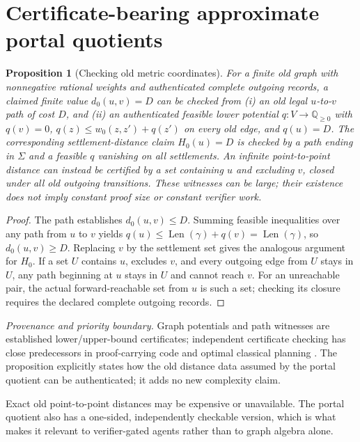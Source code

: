 \documentclass[11pt,letterpaper]{article}
\newtheorem{proposition}[theorem]{Proposition}
\newcommand{\attrib}[1]{\par\noindent\textit{Provenance and priority boundary.} #1\par}
\begin{document}
\section{Certificate-bearing approximate portal quotients}
\begin{proposition}[Checking old metric coordinates]\label{prop:metricverify}
For a finite old graph with nonnegative rational weights and authenticated complete outgoing records, a claimed finite value $d_0(u,v)=D$ can be checked from (i) an old legal $u$-to-$v$ path of cost $D$, and (ii) an authenticated feasible lower potential $q:V\to\mathbb Q_{\ge0}$ with $q(v)=0$, $q(z)\le w_0(z,z')+q(z')$ on every old edge, and $q(u)=D$. The corresponding settlement-distance claim $H_0(u)=D$ is checked by a path ending in $\Sigma$ and a feasible $q$ vanishing on all settlements. An infinite point-to-point distance can instead be certified by a set containing $u$ and excluding $v$, closed under all old outgoing transitions. These witnesses can be large; their existence does not imply constant proof size or constant verifier work.
\end{proposition}
\begin{proof}
The path establishes $d_0(u,v)\le D$. Summing feasible inequalities over any path from $u$ to $v$ yields $q(u)\le\operatorname{Len}(\gamma)+q(v)=\operatorname{Len}(\gamma)$, so $d_0(u,v)\ge D$. Replacing $v$ by the settlement set gives the analogous argument for $H_0$. If a set $U$ contains $u$, excludes $v$, and every outgoing edge from $U$ stays in $U$, any path beginning at $u$ stays in $U$ and cannot reach $v$. For an unreachable pair, the actual forward-reachable set from $u$ is such a set; checking its closure requires the declared complete outgoing records.
\end{proof}
\attrib{Graph potentials and path witnesses are established lower/upper-bound certificates; independent certificate checking has close predecessors in proof-carrying code and optimal classical planning \cite{W1,W2,Necula,Mugdan}. The proposition explicitly states how the old distance data assumed by the portal quotient can be authenticated; it adds no new complexity claim.}
Exact old point-to-point distances may be expensive or unavailable. The portal quotient also has a one-sided, independently checkable version, which is what makes it relevant to verifier-gated agents rather than to graph algebra alone.
\end{document}
